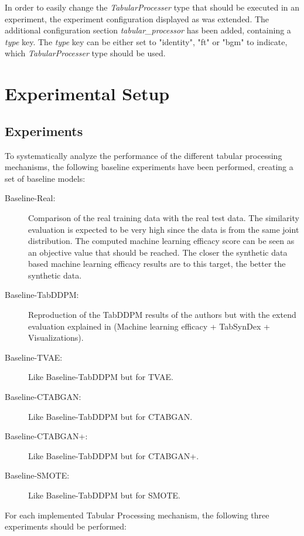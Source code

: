 In order to easily change the \textit{TabularProcesser} type that should be executed in an experiment, the experiment configuration displayed as  was extended.
The additional configuration section \textit{tabular\_processor} has been added, containing a \textit{type} key.
The \textit{type} key can be either set to "identity", "ft" or "bgm" to indicate, which \textit{TabularProcesser} type should be used.

\section{Experimental Setup}
\label{ch:methods-experimentalSetup}

\subsection{Experiments}
\label{ch:Experiments}

To systematically analyze the performance of the different tabular processing mechanisms, the following baseline experiments have been performed, creating a set of baseline models:

\begin{description}
	\item[Baseline-Real:] Comparison of the real training data with the real test data.
		The similarity evaluation is expected to be very high since the data is from the same joint distribution.
		The computed machine learning efficacy score can be seen as an objective value that should be reached.
		The closer the synthetic data based machine learning efficacy results are to this target, the better the synthetic data.
	\item[Baseline-TabDDPM:] Reproduction of the TabDDPM results of the authors \cite{kotelnikov2022TabDDPMModellingTabular} but with the extend evaluation explained in  (Machine learning efficacy + TabSynDex + Visualizations).
	\item[Baseline-TVAE:] Like Baseline-TabDDPM but for TVAE.
	\item[Baseline-CTABGAN:] Like Baseline-TabDDPM but for CTABGAN.
	\item[Baseline-CTABGAN+:] Like Baseline-TabDDPM but for CTABGAN+.
	\item[Baseline-SMOTE:] Like Baseline-TabDDPM but for SMOTE.
\end{description}

\noindent For each implemented Tabular Processing mechanism, the following three experiments should be performed:

